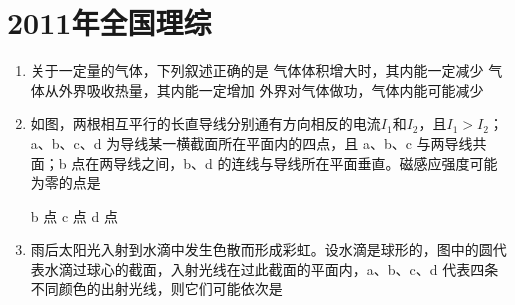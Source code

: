 \documentclass[\gkver]{gaokaozhenti}
\begin{document}
\chapter{2011年全国理综}

\begin{enumerate}
\item
关于一定量的气体，下列叙述正确的是
{气体体积增大时，其内能一定减少}
{气体从外界吸收热量，其内能一定增加}
{外界对气体做功，气体内能可能减少}


\item
如图，两根相互平行的长直导线分别通有方向相反的电流$I_{1}$和$I_{2}$，且$I_{1}>I_{2}$；a、b、c、d 为导线某一横截面所在平面内的四点，且 a、b、c 与两导线共面；b 点在两导线之间，b、d 的连线与导线所在平面垂直。磁感应强度可能为零的点是


{b 点}
{c 点}
{d 点}


\item
雨后太阳光入射到水滴中发生色散而形成彩虹。设水滴是球形的，图中的圆代表水滴过球心的截面，入射光线在过此截面的平面内，a、b、c、d 代表四条不同颜色的出射光线，则它们可能依次是



\end{enumerate}
\end{document}
